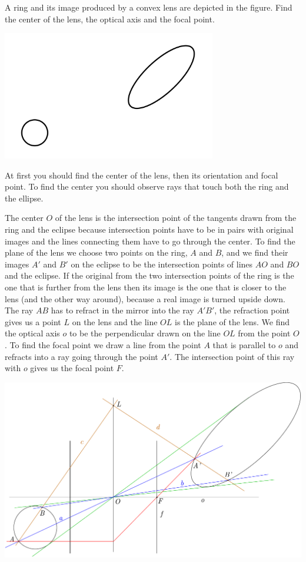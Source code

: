 A ring and its image produced by a convex lens are depicted in the figure. Find the center of the lens, the optical axis and the focal point.
\begin{center}
\includegraphics[width=0.7\textwidth]{2015-v3g-07-ringjaellips}%
\end{center}

\hinteng
At first you should find the center of the lens, then its orientation and focal point. To find the center you should observe rays that touch both the ring and the ellipse.

\solueng
The center $O$ of the lens is the intersection point of the tangents drawn from the ring and the eclipse because intersection points have to be in pairs with original images and the lines connecting them have to go through the center. To find the plane of the lens we choose two points on the ring, $A$ and $B$, and we find their images $A'$ and $B'$ on the eclipse to be the intersection points of lines $AO$ and $BO$ and the eclipse. If the original from the two intersection points of the ring is the one that is further from the lens then its image is the one that is closer to the lens (and the other way around), because a real image is turned upside down. The ray $AB$ has to refract in the mirror into the ray $A'B'$, the refraction point gives us a point $L$ on the lens and the line $OL$ is the plane of the lens. We find the optical axis $o$ to be the perpendicular drawn on the line $OL$ from the point $O$. To find the focal point we draw a line from the point $A$ that is parallel to $o$ and refracts into a ray going through the point $A'$. The intersection point of this ray with $o$ gives us the focal point $F$.
\begin{center}
\includegraphics[width=\textwidth]{2015-v3g-07-ellips_lah}
\end{center}
\probend